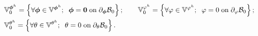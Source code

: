 %
{\begin{equation}\label{eqn:functional spaces for discretisation virtual}
  \begin{aligned}
    &
    \mathbb{V}_0^{{\boldsymbol{\phi}}^h} = \left\{
      \forall \boldsymbol{\phi}\in\mathbb{V}^{\boldsymbol{\phi}^h}; \;\;
      \boldsymbol{\phi} = \boldsymbol{0} \; \text{on} \; \partial_{\boldsymbol{\phi}}\mathcal{B}_0
    \right\} ; \qquad
    \mathbb{V}_0^{{\varphi}^h} = \left\{
      \forall\varphi\in\mathbb{V}^{\varphi^h}; \;\;
      {\varphi} = {0} \; \text{on} \; \partial_{{\varphi}}\mathcal{B}_0
    \right\} ; \\
    &
    \mathbb{V}_0^{{\theta}^h} = \left\{
      \forall\theta\in\mathbb{V}^{\theta^h}; \;\;
      {\theta} = {0} \; \text{on} \; \partial_{{\theta}}\mathcal{B}_0
      \right\} .
  \end{aligned}
\end{equation}}


